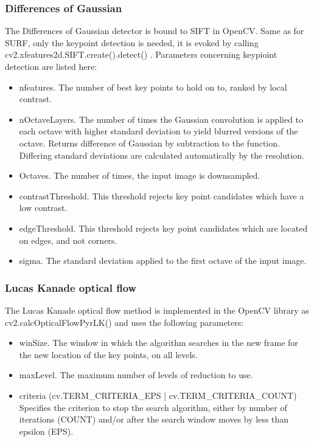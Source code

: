 \documentclass[Bachelorarbeit.tex]{subfiles}
\begin{document}
\subsubsection{Differences of Gaussian}
The Differences of Gaussian detector is bound to SIFT in OpenCV. Same as for SURF, only the keypoint detection is needed, it is evoked by calling cv2.xfeatures2d.SIFT.create().detect() \citep{itseez2019theopencv}. Parameters concerning keypioint detection are listed here:
\begin{itemize}
	\item nfeatures. The number of best key points to hold on to, ranked by local contrast.
	\item nOctaveLayers. The number of times the Gaussian convolution is applied to each octave with higher standard deviation to yield blurred versions of the octave. Returns difference of Gaussian by subtraction to the function. Differing standard deviations are calculated automatically by the resolution.
	\item Octaves. The number of times, the input image is downsampled.
	\item contrastThreshold. This threshold rejects key point candidates which have a low contrast.
	\item edgeThreshold. This threshold rejects key point candidates which are located on edges, and not corners.
	\item sigma. The standard deviation applied to the first octave of the input image. 

\end{itemize}


\subsubsection{Lucas Kanade optical flow}
The Lucas Kanade optical flow method is implemented in the OpenCV library as cv2.calcOpticalFlowPyrLK() and uses the following parameters:
\begin{itemize}
	\item winSize. The window in which the algorithm searches in the new frame for the new location of the key points, on all levels.
	\item maxLevel. The maximum number of levels of reduction to use.
	\item criteria (cv.TERM\_CRITERIA\_EPS | cv.TERM\_CRITERIA\_COUNT) Specifies the criterion to stop the search algorithm, either by number of iterations (COUNT) and/or after the search window moves by less than epsilon (EPS).
\end{itemize}
\end{document}
